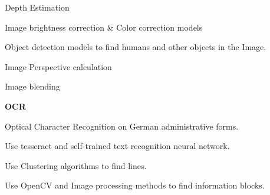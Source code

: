 \begin{rubric}{}
            \par \textbullet \hspace{1em}  Depth Estimation 
            \par \textbullet \hspace{1em}  Image brightness correction \& Color correction models
            \par \textbullet \hspace{1em}  Object detection models to find humans and other objects in the Image.
            \par \textbullet \hspace{1em}  Image Perspective calculation
            \par \textbullet \hspace{1em}  Image blending
      

\entry*[2021] \textbf{\Large OCR}
        \par Optical Character Recognition on German administrative forms.

            \par \textbullet \hspace{1em}  Use tesseract and self-trained text recognition neural network.
            \par \textbullet \hspace{1em}  Use Clustering algorithms to find lines.
            \par \textbullet \hspace{1em}  Use OpenCV and Image processing methods to find information blocks.

\end{rubric}